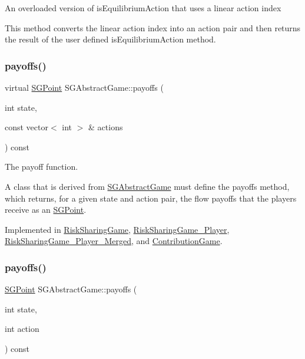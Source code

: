 An overloaded version of is\+Equilibrium\+Action that uses a linear action index

This method converts the linear action index into an action pair and then returns the result of the user defined is\+Equilibrium\+Action method. \mbox{\label{classSGAbstractGame_a3fc1cd009d1813f44f1f219e7deb6eef}} 
\subsubsection{\texorpdfstring{payoffs()}{payoffs()}\hspace{0.1cm}{\footnotesize\ttfamily [1/2]}}
{\footnotesize\ttfamily virtual \hyperlink{classSGPoint}{S\+G\+Point} S\+G\+Abstract\+Game\+::payoffs (\begin{DoxyParamCaption}\item[{int}]{state,  }\item[{const vector$<$ int $>$ \&}]{actions }\end{DoxyParamCaption}) const\hspace{0.3cm}{\ttfamily [pure virtual]}}



The payoff function. 

A class that is derived from \hyperlink{classSGAbstractGame}{S\+G\+Abstract\+Game} must define the payoffs method, which returns, for a given state and action pair, the flow payoffs that the players receive as an \hyperlink{classSGPoint}{S\+G\+Point}. 

Implemented in \hyperlink{classRiskSharingGame_a2aed9769b6518ed68b0c595629fb0129}{Risk\+Sharing\+Game}, \hyperlink{classRiskSharingGame__3Player_ae4a07f7dc66f18eccd29bc7993c0472f}{Risk\+Sharing\+Game\+\_\+Player}, \hyperlink{classRiskSharingGame__3Player__Merged_aa1d807770ff356fe1114d17966172fbd}{Risk\+Sharing\+Game\+\_\+Player\+\_\+\+Merged}, and \hyperlink{classContributionGame_ab33daef685ec7b22c44dad283c2f88cd}{Contribution\+Game}.

\mbox{\label{classSGAbstractGame_a0373c95c41562ed3ce95b3406961b1ee}} 
\subsubsection{\texorpdfstring{payoffs()}{payoffs()}\hspace{0.1cm}{\footnotesize\ttfamily [2/2]}}
{\footnotesize\ttfamily \hyperlink{classSGPoint}{S\+G\+Point} S\+G\+Abstract\+Game\+::payoffs (\begin{DoxyParamCaption}\item[{int}]{state,  }\item[{int}]{action }\end{DoxyParamCaption}) const\hspace{0.3cm}{\ttfamily [inline]}}



